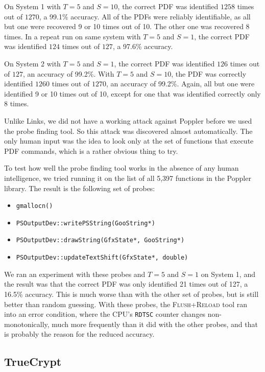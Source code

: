 \documentclass[letterpaper,twocolumn,10pt]{article}
\begin{document}
On System 1 with $T=5$ and $S=10$, the correct PDF was
identified $1258$ times out of $1270$, a 99.1\% accuracy. All of the PDFs were
reliably identifiable, as all but one were recovered 9 or 10 times out of 10.
The other one was recovered 8 times. In a repeat run on same system with $T=5$
and $S=1$, the correct PDF was identified $124$ times out
of $127$, a 97.6\% accuracy.

On System 2 with $T=5$ and $S=1$, the correct PDF was
identified $126$ times out of $127$, an accuracy of 99.2\%. With $T=5$ and
$S=10$, the PDF was correctly identified $1260$ times out
of $1270$, an accuracy of 99.2\%. Again, all but one were identified 9 or 10
times out of 10, except for one that was identified correctly only 8 times.

Unlike Links, we did not have a working attack against Poppler before we used
the probe finding tool. So this attack was discovered almost automatically. The
only human input was the idea to look only at the set of functions that execute
PDF commands, which is a rather obvious thing to try.

To test how well the probe finding tool works in the absence of any human
intelligence, we tried running it on the list of all 5,397 functions in the
Poppler library. The result is the following set of probes:

\begin{itemize}
    \item \texttt{gmallocn()}
    \item \texttt{PSOutputDev::writePSString(GooString*)}
    \item \texttt{PSOutputDev::drawString(GfxState*, GooString*)}
    \item \texttt{PSOutputDev::updateTextShift(GfxState*, double)}
\end{itemize}

We ran an experiment with these probes and $T=5$ and $S=1$
on System 1, and the result was that the correct PDF was only identified 21
times out of 127, a 16.5\% accuracy. This is much worse than with the other set
of probes, but is still better than random guessing. With these probes, the
\textsc{Flush+Reload} tool ran into an error condition, where the CPU's
\texttt{RDTSC} counter changes non-monotonically, much more frequently than it
did with the other probes, and that is probably the reason for the reduced
accuracy.

\subsection{TrueCrypt}
\end{document}

